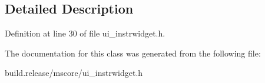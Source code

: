 \subsection{Detailed Description}


Definition at line 30 of file ui\+\_\+instrwidget.\+h.



The documentation for this class was generated from the following file\+:\begin{DoxyCompactItemize}
\item 
build.\+release/mscore/ui\+\_\+instrwidget.\+h\end{DoxyCompactItemize}
